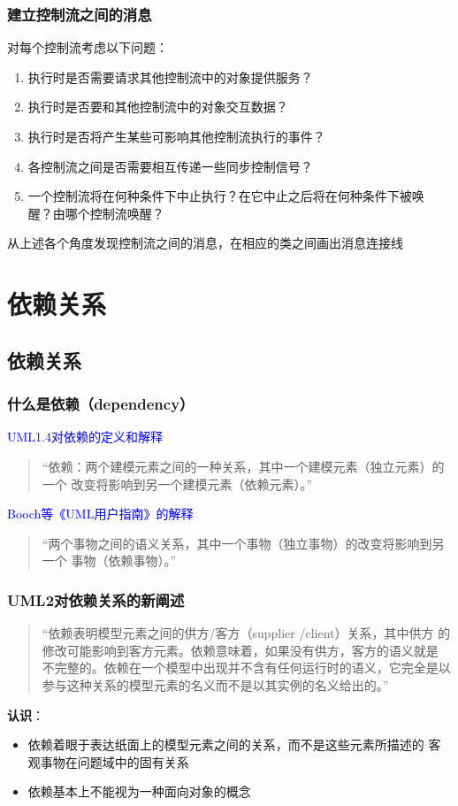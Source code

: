 \documentclass[compress]{beamer}
\begin{document}
\begin{frame}
  \frametitle{建立控制流之间的消息}
  对每个控制流考虑以下问题：
  \begin{enumerate}
    \item 执行时是否需要请求其他控制流中的对象提供服务？
    \item 执行时是否要和其他控制流中的对象交互数据？
    \item 执行时是否将产生某些可影响其他控制流执行的事件？
    \item 各控制流之间是否需要相互传递一些同步控制信号？
    \item 一个控制流将在何种条件下中止执行？在它中止之后将在何种条件下被唤
  醒？由哪个控制流唤醒？
  \end{enumerate}

  从上述各个角度发现控制流之间的消息，在相应的类之间画出消息连接线 

\end{frame}

\section{依赖关系}

\subsection{依赖关系}

\begin{frame}
  \frametitle{什么是依赖（dependency）}
  \textcolor{blue}{UML1.4对依赖的定义和解释}
  \begin{quote}
  “依赖：两个建模元素之间的一种关系，其中一个建模元素（独立元素）的一个
  改变将影响到另一个建模元素（依赖元素）。”
\end{quote}

\textcolor{blue}{Booch等《UML用户指南》的解释}
   \begin{quote}
   “两个事物之间的语义关系，其中一个事物（独立事物）的改变将影响到另一个
   事物（依赖事物）。”
 \end{quote}

\end{frame}

\begin{frame}
  \frametitle{UML2对依赖关系的新阐述}
  \begin{quote}
     “依赖表明模型元素之间的供方/客方（supplier /client）关系，其中供方
     的修改可能影响到客方元素。依赖意味着，如果没有供方，客方的语义就是
     不完整的。依赖在一个模型中出现并不含有任何运行时的语义，它完全是以
     参与这种关系的模型元素的名义而不是以其实例的名义给出的。”
   \end{quote}

   \alert{\textbf{认识}：} \\
   \begin{itemize}
     \item 依赖着眼于表达纸面上的模型元素之间的关系，而不是这些元素所描述的
       客观事物在问题域中的固有关系
     \item 依赖基本上不能视为一种面向对象的概念
   \end{itemize}
\end{frame}
\end{document}
